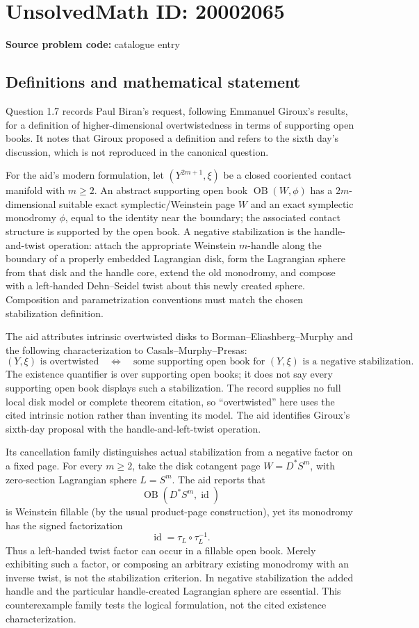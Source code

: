 \documentclass[11pt]{article}
\begin{document}
\section*{UnsolvedMath ID: 20002065}
\textbf{Source problem code:} catalogue entry
\subsection{Definitions and mathematical statement}
Question 1.7 records Paul Biran's request, following Emmanuel Giroux's results, for a definition of higher-dimensional overtwistedness in terms of supporting open books. It notes that Giroux proposed a definition and refers to the sixth day's discussion, which is not reproduced in the canonical question.

For the aid's modern formulation, let \((Y^{2m+1},\xi)\) be a closed cooriented contact manifold with \(m\ge2\). An abstract supporting open book \(\operatorname{OB}(W,\phi)\) has a \(2m\)-dimensional suitable exact symplectic/Weinstein page \(W\) and an exact symplectic monodromy \(\phi\), equal to the identity near the boundary; the associated contact structure is supported by the open book. A negative stabilization is the handle-and-twist operation: attach the appropriate Weinstein \(m\)-handle along the boundary of a properly embedded Lagrangian disk, form the Lagrangian sphere from that disk and the handle core, extend the old monodromy, and compose with a left-handed Dehn--Seidel twist about this newly created sphere. Composition and parametrization conventions must match the chosen stabilization definition.

The aid attributes intrinsic overtwisted disks to Borman--Eliashberg--Murphy and the following characterization to Casals--Murphy--Presas:
\[
 (Y,\xi)\text{ is overtwisted}
 \quad\Longleftrightarrow\quad
 \text{some supporting open book for }(Y,\xi)
 \text{ is a negative stabilization}.
\]
The existence quantifier is over supporting open books; it does not say every supporting open book displays such a stabilization. The record supplies no full local disk model or complete theorem citation, so ``overtwisted'' here uses the cited intrinsic notion rather than inventing its model. The aid identifies Giroux's sixth-day proposal with the handle-and-left-twist operation.

Its cancellation family distinguishes actual stabilization from a negative factor on a fixed page. For every \(m\ge2\), take the disk cotangent page \(W=D^*S^m\), with zero-section Lagrangian sphere \(L=S^m\). The aid reports that
\[
 \operatorname{OB}(D^*S^m,\operatorname{id})
\]
is Weinstein fillable (by the usual product-page construction), yet its monodromy has the signed factorization
\[
 \operatorname{id}=\tau_L\circ\tau_L^{-1}.
\]
Thus a left-handed twist factor can occur in a fillable open book. Merely exhibiting such a factor, or composing an arbitrary existing monodromy with an inverse twist, is not the stabilization criterion. In negative stabilization the added handle and the particular handle-created Lagrangian sphere are essential. This counterexample family tests the logical formulation, not the cited existence characterization.
\end{document}
